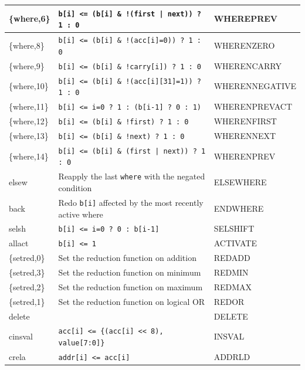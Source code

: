 \begin{table}[H]
\begin{longtable}{|l|l|l|}
\{where,6\}   & \texttt{b[i] <= (b[i] \& !(first | next)) ? 1 : 0} & WHEREPREV      \\ \hline
\{where,8\}   & \texttt{b[i] <= (b[i] \& !(acc[i]=0)) ? 1 : 0}    & WHERENZERO     \\ \hline
\{where,9\}   & \texttt{b[i] <= (b[i] \& !carry[i]) ? 1 : 0}      & WHERENCARRY    \\ \hline
\{where,10\}  & \texttt{b[i] <= (b[i] \& !(acc[i][31]=1)) ? 1 : 0} & WHERENNEGATIVE \\ \hline
\{where,11\}  & \texttt{b[i] <= i=0 ? 1 : (b[i-1] ? 0 : 1)}       & WHERENPREVACT  \\ \hline
\{where,12\}  & \texttt{b[i] <= (b[i] \& !first) ? 1 : 0}         & WHERENFIRST    \\ \hline
\{where,13\}  & \texttt{b[i] <= (b[i] \& !next) ? 1 : 0}          & WHERENNEXT     \\ \hline
\{where,14\}  & \texttt{b[i] <= (b[i] \& (first | next)) ? 1 : 0} & WHERENPREV     \\ \hline
elsew         & Reapply the last \texttt{where} with the negated condition & ELSEWHERE     \\ \hline
back          & Redo \texttt{b[i]} affected by the most recently active where & ENDWHERE     \\ \hline
selsh         & \texttt{b[i] <= i=0 ? 0 : b[i-1]}                 & SELSHIFT       \\ \hline
allact        & \texttt{b[i] <= 1}                                & ACTIVATE       \\ \hline
\{setred,0\}  & Set the reduction function on addition            & REDADD         \\ \hline
\{setred,3\}  & Set the reduction function on minimum             & REDMIN         \\ \hline
\{setred,2\}  & Set the reduction function on maximum             & REDMAX         \\ \hline
\{setred,1\}  & Set the reduction function on logical OR          & REDOR          \\ \hline
delete        &                                                  & DELETE         \\ \hline
cinsval       & \texttt{acc[i] <= \{(acc[i] << 8), value[7:0]\}}  & INSVAL         \\ \hline
crela         & \texttt{addr[i] <= acc[i]}                       & ADDRLD         \\ \hline
\end{longtable}
\end{table}



